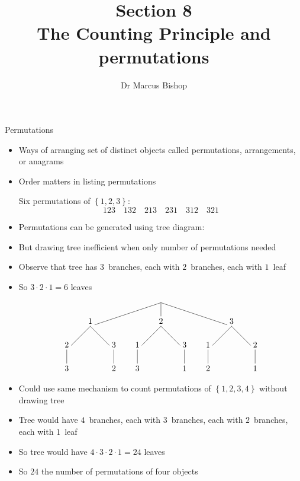 \documentclass{beamer}
\title[\S8]{Section 8\\The Counting Principle and permutations}
\author{Dr Marcus Bishop}
\theoremstyle{definition}
\begin{document}
\begin{frame}\titlepage\end{frame}
\LogoOff

\begin{frame}{Permutations}
\begin{itemize}
\item Ways of arranging set of distinct objects called
\alert{permutations}, \alert{arrangements}, or \alert{anagrams}
\item Order matters in listing permutations
\begin{example} Six permutations of $\left\{1,2,3\right\}$:
\[123\quad 132\quad 213\quad 231\quad 312\quad 321\]
\end{example}
\item Permutations can be generated using tree diagram:
\only<+->{
\[\begin{xy}<1cm,0cm>:
(0,0)="0";
(-3,-1)="-31";
(0,-1)="01";
(3,-1)="31";
"0";"-31"*+!D{1}**\dir{-};
"0";"01"*+!D{2}**\dir{-};
"0";"31"*+!D{3}**\dir{-};
"-31";(-4,-2)*+!D{2}**\dir{-};
(-4,-3)*+!D{3}**\dir{-};
"-31";(-2,-2)*+!D{3}**\dir{-};
(-2,-3)*+!D{2}**\dir{-};
"01";(-1,-2)*+!D{1}**\dir{-};
(-1,-3)*+!D{3}**\dir{-};
"01";(1,-2)*+!D{3}**\dir{-};
(1,-3)*+!D{1}**\dir{-};
"31";(2,-2)*+!D{1}**\dir{-};
(2,-3)*+!D{2}**\dir{-};
"31";(4,-2)*+!D{2}**\dir{-};
(4,-3)*+!D{1}**\dir{-};
\end{xy}\]}
\end{itemize}
\end{frame}

\begin{frame}
\begin{itemize}
\item But drawing tree inefficient when only
\alert{number} of permutations needed
\item Observe that tree has $3$~branches,
each with $2$~branches, each with $1$~leaf
\item So $3\cdot 2\cdot 1=6$ leaves
\[\begin{xy}<1cm,0cm>:
(0,0)="0";
(-3,-1)="-31";
(0,-1)="01";
(3,-1)="31";
"0";"-31"*+!D{1}**\dir{-};
"0";"01"*+!D{2}**\dir{-};
"0";"31"*+!D{3}**\dir{-};
"-31";(-4,-2)*+!D{2}**\dir{-};
(-4,-3)*+!D{3}**\dir{-};
"-31";(-2,-2)*+!D{3}**\dir{-};
(-2,-3)*+!D{2}**\dir{-};
"01";(-1,-2)*+!D{1}**\dir{-};
(-1,-3)*+!D{3}**\dir{-};
"01";(1,-2)*+!D{3}**\dir{-};
(1,-3)*+!D{1}**\dir{-};
"31";(2,-2)*+!D{1}**\dir{-};
(2,-3)*+!D{2}**\dir{-};
"31";(4,-2)*+!D{2}**\dir{-};
(4,-3)*+!D{1}**\dir{-};
\end{xy}\]
\item Could use same mechanism to count permutations
of $\left\{1,2,3,4\right\}$ without drawing tree
\item Tree would have $4$~branches, each with $3$~branches,
each with $2$~branches, each with $1$~leaf
\item So tree would have $4\cdot 3\cdot 2\cdot 1=24$ leaves
\item So $24$ the number of permutations of four objects
\end{itemize}
\end{frame}
\end{document}

